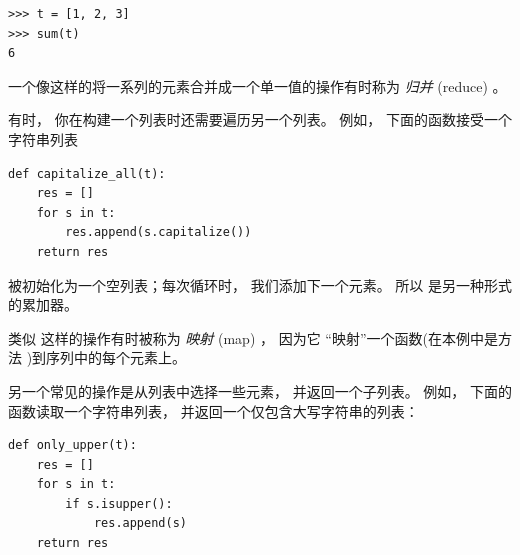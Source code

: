\begin{lstlisting}
>>> t = [1, 2, 3]
>>> sum(t)
6
\end{lstlisting}
%

一个像这样的将一系列的元素合并成一个单一值的操作有时称为 {\em 归并} (reduce) 。

  


有时， 你在构建一个列表时还需要遍历另一个列表。   例如， 下面的函数接受一个字符串列表

\begin{lstlisting}
def capitalize_all(t):
    res = []
    for s in t:
        res.append(s.capitalize())
    return res
\end{lstlisting}

%

 被初始化为一个空列表；每次循环时， 我们添加下一个元素。
所以  是另一种形式的累加器。



类似  这样的操作有时被称为 {\em 映射} (map) ， 因为它 ``映射''一个函数(在本例中是方法  )到序列中的每个元素上。

  
  


另一个常见的操作是从列表中选择一些元素， 并返回一个子列表。  例如， 下面的函数读取一个字符串列表， 并返回一个仅包含大写字符串的列表：

\begin{lstlisting}
def only_upper(t):
    res = []
    for s in t:
        if s.isupper():
            res.append(s)
    return res
\end{lstlisting}

